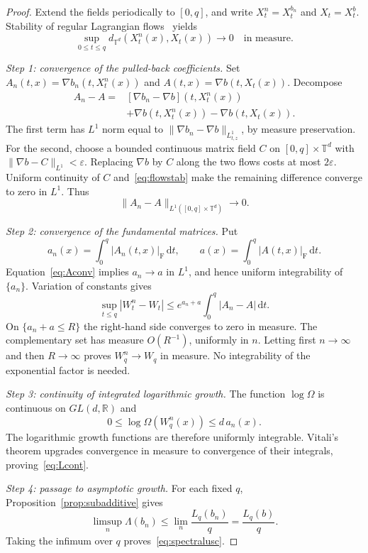 \documentclass[review,12pt,times,a4paper,nopreprintline]{elsarticle}
\theoremstyle{plain}
\theoremstyle{definition}
\theoremstyle{remark}
\newcommand{\T}{\mathbb T}
\newcommand{\R}{\mathbb R}
\newcommand{\dd}{\,\mathrm d}
\numberwithin{equation}{section}
\begin{document}
\begin{proof}
Extend the fields periodically to $[0,q]$, and write $X_t^n=X_t^{b_n}$ and $X_t=X_t^b$. Stability of regular Lagrangian flows~\cite{DL,Ambrosio} yields
\begin{equation}\label{eq:flowstab}
 \sup_{0\leq t\leq q}d_{\T^d}(X_t^n(x),X_t(x))\longrightarrow0
 \quad\text{in measure}.
\end{equation}

\emph{Step 1: convergence of the pulled-back coefficients.}
Set $A_n(t,x)=\nabla b_n(t,X_t^n(x))$ and $A(t,x)=\nabla b(t,X_t(x))$. Decompose
\begin{align*}
 A_n-A={}&[\nabla b_n-\nabla b](t,X_t^n(x))\\
 &+\nabla b(t,X_t^n(x))-\nabla b(t,X_t(x)).
\end{align*}
The first term has $L^1$ norm equal to $\|\nabla b_n-\nabla b\|_{L^1_{t,z}}$, by measure preservation. For the second, choose a bounded continuous matrix field $C$ on $[0,q]\times\T^d$ with $\|\nabla b-C\|_{L^1}<\varepsilon$. Replacing $\nabla b$ by $C$ along the two flows costs at most $2\varepsilon$. Uniform continuity of $C$ and~\eqref{eq:flowstab} make the remaining difference converge to zero in $L^1$. Thus
\begin{equation}\label{eq:Aconv}
 \|A_n-A\|_{L^1([0,q]\times\T^d)}\longrightarrow0.
\end{equation}

\emph{Step 2: convergence of the fundamental matrices.}
Put
\[
 a_n(x)=\int_0^q|A_n(t,x)|_{\mathrm F}\dd t,\qquad
 a(x)=\int_0^q|A(t,x)|_{\mathrm F}\dd t.
\]
Equation~\eqref{eq:Aconv} implies $a_n\to a$ in $L^1$, and hence uniform integrability of $\{a_n\}$. Variation of constants gives
\begin{equation}\label{eq:Wdifference}
 \sup_{t\leq q}|W_t^n-W_t|
 \leq e^{a_n+a}\int_0^q|A_n-A|\dd t.
\end{equation}
On $\{a_n+a\leq R\}$ the right-hand side converges to zero in measure. The complementary set has measure $O(R^{-1})$, uniformly in $n$. Letting first $n\to\infty$ and then $R\to\infty$ proves $W_q^n\to W_q$ in measure. No integrability of the exponential factor is needed.

\emph{Step 3: continuity of integrated logarithmic growth.}
The function $\log\Omega$ is continuous on $GL(d,\R)$ and
\[
 0\leq\log\Omega(W_q^n(x))\leq d\,a_n(x).
\]
The logarithmic growth functions are therefore uniformly integrable. Vitali's theorem upgrades convergence in measure to convergence of their integrals, proving~\eqref{eq:Lcont}.

\emph{Step 4: passage to asymptotic growth.}
For each fixed $q$, Proposition~\ref{prop:subadditive} gives
\[
 \limsup_n\Lambda(b_n)\leq\lim_n\frac{L_q(b_n)}q=\frac{L_q(b)}q.
\]
Taking the infimum over $q$ proves~\eqref{eq:spectralusc}.
\end{proof}
\end{document}
